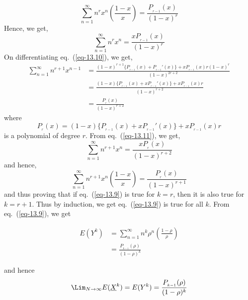 \begin{multicols}{2}
\begin{equation}\nonumber
\displaystyle{\sum_{n=1}^{\infty}}n^r x^n \left(\frac{1-x}{x}\right) = \displaystyle{\frac{P_{_{r-1}}(x)}{(1-x)^r}}
\end{equation}
Hence, we get,
\begin{equation}
\displaystyle{\sum_{n=1}^{\infty}}n^r x^n = \frac{xP_{_{r-1}}(x)}{(1-x)^r}\label{eq-13.10}
\end{equation}
On differentiating eq.~(\ref{eq-13.10}), we get,
{\fontsize{8}{9}\selectfont\begin{align}
\displaystyle{\sum_{n=1}^{\infty}}n^{r+1}x^{n-1} &= \frac{(1-x)^{r+1}\{P_{_{r-1}}(x)+P_{_{r-1}}'(x)\}+ xP_{_{r-1}}(x)r(1-x)^r}{(1-x)^{2r+2}}\nonumber\\
&= \frac{(1-x)\{P_{_{r-1}}(x) + xP_{_{r-1}}'(x)\}+ xP_{_{r-1}}(x)r}{(1-x)^{r+2}}\nonumber\\
&= \frac{P_{_r}(x)}{(1-x)^{r+2}}\label{eq-13.11}
\end{align}}
where 
\begin{equation}
P_{_r}(x) = (1-x)\{P_{_{r-1}}(x) + xP_{_{r-1}}'(x)\} + xP_{_{r-1}}(x)r\label{eq-13.12}
\end{equation}
is a polynomial of degree $r$. From eq.~(\ref{eq-13.11}), we get,
\begin{equation}\nonumber
\displaystyle{\sum_{n=1}^{\infty}}n^{r+1}x^n = \frac{xP_{_r}(x)}{(1-x)^{r+2}}
\end{equation}
and hence,
\begin{equation}\nonumber
\displaystyle{\sum_{n=1}^{\infty}}n^{r+1}x^n\left(\frac{1-x}{x}\right) = \frac{P_{_r}(x)}{(1-x)^{r+1}}
\end{equation}
and thus proving that if eq.~(\ref{eq-13.9}) is true for $k = r$, then it is also true for $k = r+1$. Thus by induction, we get eq.~(\ref{eq-13.9}) is true for all $k$.
From eq.~(\ref{eq-13.9}), we get

\vspace{-1cm}

\begin{align}
E(Y^k) &= \displaystyle{\sum_{n=1}^{\infty}}n^k \rho^n \left(\frac{1-\rho}{\rho}\right)\nonumber\\
       &= \frac{P_{_{k-1}}(\rho)}{(1-\rho)^{k}}\nonumber
\end{align}

\vspace{-.8cm}

and hence
\begin{equation}
\label{eq-13.13}
\displaystyle{\Lim_{N \rightarrow \infty}}E(\underline{X}^k) = E(Y^k) = \displaystyle{\frac{P_{_{k-1}}(\rho)}{(1-\rho)^k}}
\end{equation}


\end{multicols}
